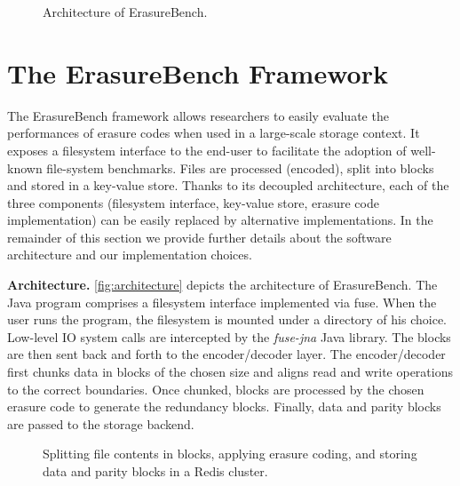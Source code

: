 \begin{figure}[t]
    \centering
    
    \caption{Architecture of ErasureBench.}
    \label{fig:architecture}
\end{figure}

\section{The ErasureBench Framework}
\label{sec:erasure-tester}

The ErasureBench framework allows researchers to easily evaluate the performances of erasure codes when used in a large-scale storage context.
It exposes a filesystem interface to the end-user to facilitate the adoption of well-known file-system benchmarks.
Files are processed (encoded), split into blocks and stored in a key-value store.
Thanks to its decoupled architecture, each of the three components (filesystem interface, key-value store, erasure code implementation) can be easily replaced by alternative implementations. 
In the remainder of this section we provide further details about the software architecture and our implementation choices.

\textbf{Architecture.} \autoref{fig:architecture} depicts the architecture of ErasureBench.
The Java program comprises a filesystem interface implemented via \ac{fuse}. 
When the user runs the program, the filesystem is mounted under a directory of his choice. 
Low-level IO system calls are intercepted by the \textit{fuse-jna} \autocite{fuse-jna} Java library.
The blocks are then sent back and forth to the encoder/decoder layer. 
The encoder/decoder first chunks data in blocks of the chosen size and aligns read and write operations to the correct boundaries. 
Once chunked, blocks are  processed by the chosen erasure code to generate the redundancy blocks. 
Finally, data and parity blocks are passed to the storage backend.

\begin{figure}[t]
    \centering
    
    \caption{Splitting file contents in blocks, applying erasure coding, and storing data and parity blocks in a Redis cluster.}
    \label{fig:blocks}
\end{figure}

